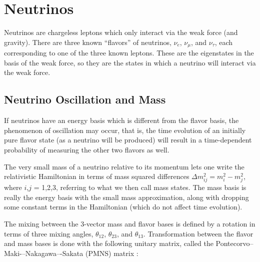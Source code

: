 \section{Neutrinos}

Neutrinos are chargeless leptons which only interact via the weak force (and gravity).  There are three known ``flavors'' of neutrinos, $\nu_{e}$, $\nu_{\mu}$, and $\nu_{\tau}$, each corresponding to one of the three known leptons.  These are the eigenstates in the basis of the weak force, so they are the states in which a neutrino will interact via the weak force.

\subsection{Neutrino Oscillation and Mass}

If neutrinos have an energy basis which is different from the flavor basis, the phenomenon of oscillation may occur, that is, the time evolution of an initially pure flavor state (as a neutrino will be produced) will result in a time-dependent probability of measuring the other two flavors as well.  

The very small mass of a neutrino relative to its momentum lets one write the relativistic Hamiltonian in terms of mass squared differences $\Delta m_{ij}^{2} = m_{i}^{2} - m_{j}^{2}$, where $i$,$j$ = 1,2,3, referring to what we then call mass states.  The mass basis is really the energy basis with the small mass approximation, along with dropping some constant terms in the Hamiltonian (which do not affect time evolution).

The mixing between the 3-vector mass and flavor bases is defined by a rotation in terms of three mixing angles, $\theta_{12}$, $\theta_{23}$, and $\theta_{13}$.  Transformation between the flavor and mass bases is done with the following unitary matrix, called the Pontecorvo--Maki-–Nakagawa–-Sakata (PMNS) matrix \cite{ReviewNuMass}:

